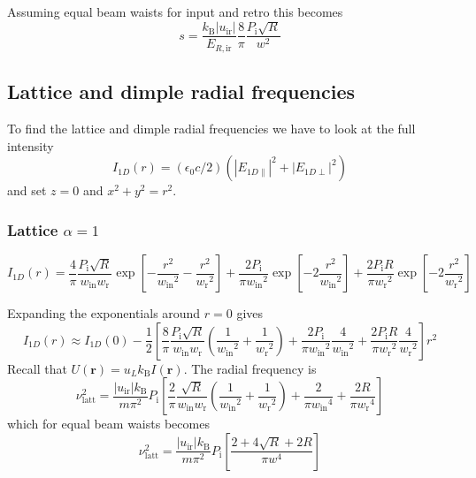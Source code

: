 \documentclass[11pt,letter]{article}
\newcommand{\bv}[1]{\ensuremath{\bm{#1}}}
\newcommand{\pin}{\ensuremath{ P_{\text{i}}} }
\newcommand{\win}{\ensuremath{ w_{\text{in}}} }
\newcommand{\wret}{\ensuremath{ w_{\text{r}}} }
\begin{document}
Assuming equal beam waists for input and retro this becomes
\begin{equation}
  s = 
  \frac{ k_{\text{B}} |u_{\text{ir}}| }{E_{R,\text{ir}}}
  \frac{8}{\pi}  
    \frac{ \pin \sqrt{ R } }{ w^{2}} 
\end{equation}
 

\subsection{Lattice and dimple radial frequencies}

To find the lattice and dimple radial frequencies we have to look at the full
intensity \[I_{1D}(r) = (\epsilon_{0}c/2)( |E_{1D\parallel}|^{2} + |E_{1D\perp}|^{2} ) \] and
set $z=0$ and $x^{2}+y^{2}=r^{2}$.

\subsubsection{Lattice $\alpha=1$}

\begin{equation}
I_{1D}(r) = 
\frac{4}{\pi} \frac{\pin \sqrt{R}}{ \win \wret} 
    \exp\left[-\frac{r^2}{\win^{2}} - \frac{r^{2}}{\wret^{2}} \right]
+
\frac{2 \pin }{\pi \win^{2}}
\exp\left[-2\frac{ r^2}{\win^{2}}\right]
+\frac{2 \pin R }{\pi \wret^{2}} 
  \exp\left[-2\frac{ r^2}{\wret^{2}}\right]
\end{equation}

Expanding the exponentials around $r=0$ gives 
\begin{equation}
I_{1D}(r) \approx I_{1D}(0)  - \frac{1}{2} 
\left[ 
\frac{8}{\pi} \frac{\pin \sqrt{R}}{ \win \wret}
 \left( \frac{1}{\win^{2}} +  \frac{1}{\wret^{2}} \right) 
+ 
\frac{2 \pin }{\pi \win^{2}} \frac{4}{\win^{2}} 
+ 
\frac{2 \pin R}{\pi \wret^{2}} \frac{4}{\wret^{2}} 
\right] r^{2}	
\end{equation}
Recall that $U(\bv{r}) = u_{L}k_{\text{B}} I(\bv{r})$.  The radial frequency is 
\begin{equation}
 \nu_{\text{latt}}^{2} = 
 \frac{|u_{\text{ir}}| k_{\text{B}} }{m\pi^{2}}
 \pin
\left[
\frac{2}{\pi} \frac{\sqrt{R}}{ \win \wret}
 \left( \frac{1}{\win^{2}} +  \frac{1}{\wret^{2}} \right) 
+ 
\frac{2  }{\pi \win^{4}} 
+ 
\frac{2 R}{\pi \wret^{4}}
\right]
\end{equation}
which for equal beam waists becomes 
\begin{equation}
 \nu_{\text{latt}}^{2} = 
 \frac{|u_{\text{ir}}| k_{\text{B}} }{m\pi^{2}}
 \pin
\left[
\frac{2 + 4 \sqrt{R} + 2R}{ \pi w^{4} }
\right]
\end{equation}
\end{document}
